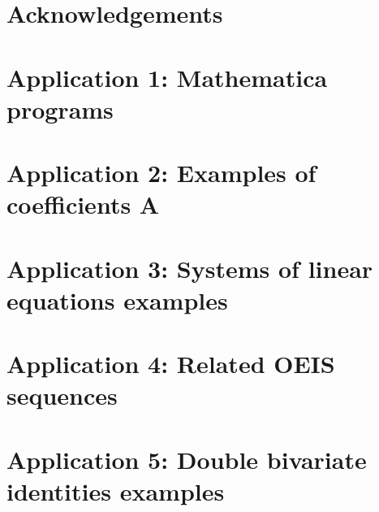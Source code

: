 \documentclass[12pt,letterpaper,oneside,reqno]{amsart}
\begin{document}
    \section*{Acknowledgements}
    

    
    

    

    \clearpage


    \section*{Application 1: Mathematica programs}
    

    \clearpage


    \section*{Application 2: Examples of coefficients A}
    

    \clearpage


    \section*{Application 3: Systems of linear equations examples}
    

    \clearpage


    \section*{Application 4: Related OEIS sequences}
    

    \clearpage


    \section*{Application 5: Double bivariate identities examples}
    

    \clearpage
\end{document}
